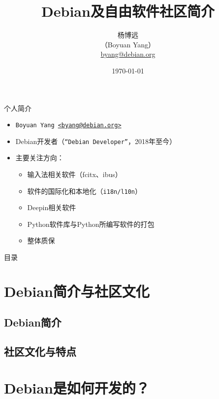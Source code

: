 \documentclass[aspectratio=169]{beamer}
\title[Intro to Debian and FLOSS community]{Debian及自由软件社区简介}
\author[@byang/@hosiet]{杨博远 \\ （Boyuan Yang） \\ \href{mailto:byang@debian.org}{byang@debian.org} }
\institute[Debian]{Debian Project}
\date{\today}
\begin{document}
	
\begin{frame}
\titlepage
\end{frame}

\begin{frame}{个人简介}
	\begin{itemize}
		\item \texttt{Boyuan Yang \href{mailto:byang@debian.org}{<byang@debian.org>}}
		\item Debian开发者（\texttt{“Debian Developer”}，2018年至今）
		\item 主要关注方向： \\
		\begin{itemize}
			\item 输入法相关软件（fcitx、ibus）
			\item 软件的国际化和本地化（\texttt{i18n/l10n}）
			\item Deepin相关软件
			\item Python软件库与Python所编写软件的打包
			\item 整体质保
		\end{itemize}
	\end{itemize}
    \vfill
\end{frame}


\begin{frame}{目录}
\tableofcontents
\end{frame}



\section{Debian简介与社区文化}

\subsection{Debian简介}


\subsection{社区文化与特点}




\section{Debian是如何开发的？}
\end{document}
